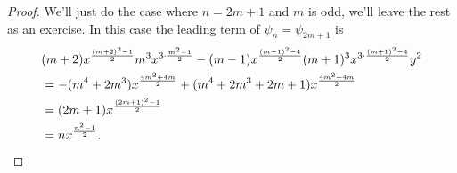 \begin{proof}
We'll just do the case where $n = 2m+1$ and $m$ is odd, we'll leave the rest as an exercise.
In this case the leading term of $\psi_n = \psi_{2m+1}$ is
\begin{align*}
& (m+2)x^{\frac{(m+2)^2-1}{2}}m^3x^{3\cdot \frac{m^2-1}{2}}-(m-1)x^{\frac{(m-1)^2-4}{2}}(m+1)^3x^{3\cdot \frac{(m+1)^2-4}{2}}y^2\\
&= -(m^4+2m^3)x^{\frac{4m^2+4m}{2}}+(m^4+2m^3+2m+1)x^{\frac{4m^2+4m}{2}}\\
&= (2m+1)x^{\frac{(2m+1)^2-1}{2}}\\
&= nx^{\frac{n^2-1}{2}}.\qedhere
\end{align*}
\end{proof}
%
%

%

%

